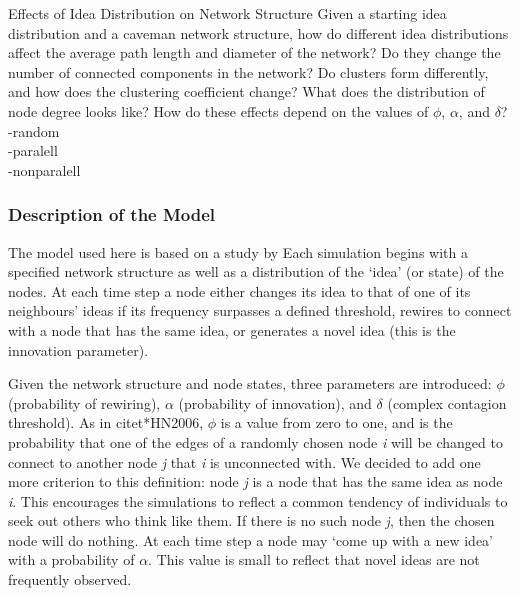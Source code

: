 \documentclass{beamer}
\begin{document}
%
\begin{frame}
{Effects of Idea Distribution on Network Structure}
Given a starting idea distribution and a caveman network structure, how do different idea distributions affect the average path length and diameter of the network? Do they change the number of connected components in the network? Do clusters form differently, and how does the clustering coefficient change? What does the distribution of node degree looks like? How do these effects depend on the values of $\phi$, $\alpha$, and $\delta$?
-random\\
-paralell\\
-nonparalell\\
\end{frame}
%
\begin{frame}
\frametitle{Description of the Model}

The model used here is based on a study by %
  Each simulation begins with a specified network structure as well as a distribution of the `idea' (or state) of the nodes. At each time step a node either changes its idea to that of one of its neighbours' ideas if its frequency surpasses a defined threshold, rewires to connect with a node that has the same idea, or generates a novel idea (this is the innovation parameter). 
\end{frame}
%
\begin{frame}
Given the network structure and node states, three parameters are introduced: $\phi$ (probability of rewiring), $\alpha$ (probability of innovation), and $\delta$ (complex contagion threshold). As in \alert{citet*{HN2006}}, $\phi$ is a value from zero to one, and is the probability that one of the edges of a randomly chosen node \emph{i} will be changed to connect to another node \emph{j} that \emph{i} is unconnected with. We decided to add one more criterion to this definition: node \emph{j} is a node that has the same idea as node \emph{i}. This encourages the simulations to reflect a common tendency of individuals to seek out others who think like them. If there is no such node \emph{j}, then the chosen node will do nothing.
At each time step a node may `come up with a new idea' with a probability of $\alpha$. This value is small to reflect that novel ideas are not frequently observed.
\end{frame}
%
\end{document}
